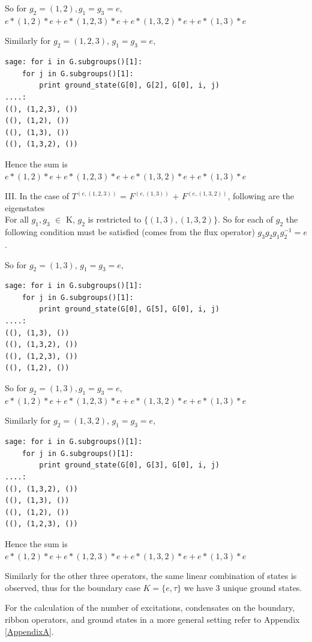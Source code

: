 So for $g_{2} = (1,2), g_{1} = g_{3} = e$, 
$e*(1,2)*e + e*(1,2,3)*e + e*(1,3,2)*e + e*(1,3)*e$

Similarly for $g_{2} = (1,2,3)$, $g_{1} = g_{3} = e$, 
\begin{lstlisting}[frame=single]
sage: for i in G.subgroups()[1]:
    for j in G.subgroups()[1]:
        print ground_state(G[0], G[2], G[0], i, j)
....: 
((), (1,2,3), ())
((), (1,2), ())
((), (1,3), ())
((), (1,3,2), ())
\end{lstlisting}

Hence the sum is $e*(1,2)*e + e*(1,2,3)*e + e*(1,3,2)*e + e*(1,3)*e$

III. In the case of $T^{(e,(1,2,3))}$ = $F^{(e,(1,3))}$ + $F^{(e,(1,3,2))}$, following are the eigenstates \\
For all  $g_{1}, g_{3}$ $\in$ K, $g_{2}$ is restricted to  $\{(1,3), (1,3,2)\}$.
So for each of $g_{2}$ the following condition must be satisfied (comes from the flux operator) $g_{3}g_{2}g_{1}g_{2}^{-1} =  e$.

So for $g_{2} = (1,3)$, $g_{1} = g_{3} = e$,  
\begin{lstlisting}[frame=single]
sage: for i in G.subgroups()[1]:
    for j in G.subgroups()[1]:
        print ground_state(G[0], G[5], G[0], i, j)
....: 
((), (1,3), ())
((), (1,3,2), ())
((), (1,2,3), ())
((), (1,2), ())
\end{lstlisting}

So for $g_{2} = (1,3), g_{1} = g_{3} = e$, 
$e*(1,2)*e + e*(1,2,3)*e + e*(1,3,2)*e + e*(1,3)*e$

Similarly for $g_{2} = (1,3,2)$, $g_{1} = g_{3} = e$, 
\begin{lstlisting}[frame=single]
sage: for i in G.subgroups()[1]:
    for j in G.subgroups()[1]:
        print ground_state(G[0], G[3], G[0], i, j)
....: 
((), (1,3,2), ())
((), (1,3), ())
((), (1,2), ())
((), (1,2,3), ())
\end{lstlisting}

Hence the sum is $e*(1,2)*e + e*(1,2,3)*e + e*(1,3,2)*e + e*(1,3)*e$

Similarly for the other three operators, the same linear combination of states is observed, thus 
for the boundary case $K = \{e, \tau\}$ we have 3 unique ground states.

For the calculation of the number of excitations, condensates on the boundary, ribbon operators,
and ground states in a more general setting refer to Appendix \ref{AppendixA}.
